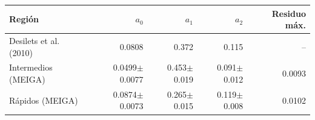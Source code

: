 \begin{tabular}{lrrrr}
\toprule
Región & $a_0$ & $a_1$ & $a_2$ & Residuo máx. \\
\midrule
Desilets et al. (2010) & 0.0808 & 0.372 & 0.115 & -- \\
Intermedios (MEIGA) & 0.0499$\pm$0.0077 & 0.453$\pm$0.019 & 0.091$\pm$0.012 & 0.0093 \\
Rápidos (MEIGA) & 0.0874$\pm$0.0073 & 0.265$\pm$0.015 & 0.119$\pm$0.008 & 0.0102 \\
\bottomrule
\end{tabular}
